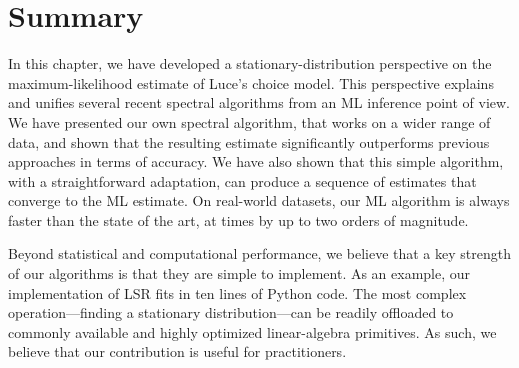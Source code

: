 \section{Summary}
\label{fi:sec:summary}

In this chapter, we have developed a stationary-distribution perspective on the maximum-likelihood estimate of Luce's choice model.
This perspective explains and unifies several recent spectral algorithms from an ML inference point of view.
We have presented our own spectral algorithm, that works on a wider range of data, and shown that the resulting estimate significantly outperforms previous approaches in terms of accuracy.
We have also shown that this simple algorithm, with a straightforward adaptation, can produce a sequence of estimates that converge to the ML estimate.
On real-world datasets, our ML algorithm is always faster than the state of the art, at times by up to two orders of magnitude.

Beyond statistical and computational performance, we believe that a key strength of our algorithms is that they are simple to implement.
As an example, our implementation of LSR fits in ten lines of Python code.
The most complex operation---finding a stationary distribution---can be readily offloaded to commonly available and highly optimized linear-algebra primitives.
As such, we believe that our contribution is useful for practitioners.
